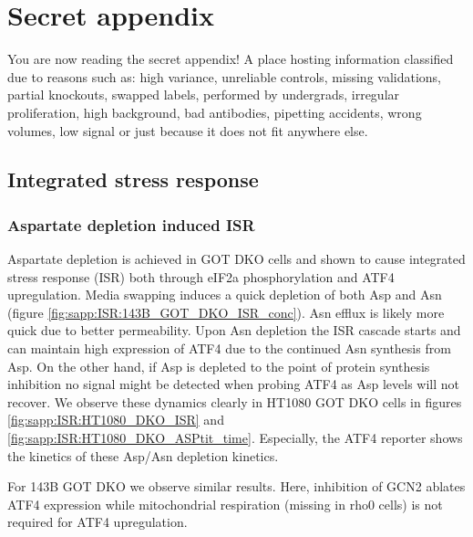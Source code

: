 \chapter{Secret appendix}
You are now reading the secret appendix!
A place hosting information classified due to reasons such as: high variance, unreliable controls, missing validations, partial knockouts, swapped labels, performed by undergrads, irregular proliferation, high background, bad antibodies, pipetting accidents, wrong volumes, low signal or just because it does not fit anywhere else.



\section{Integrated stress response}

\subsection{Aspartate depletion induced ISR}
Aspartate depletion is achieved in GOT DKO cells and shown to cause integrated stress response (ISR) both through eIF2a phosphorylation and ATF4 upregulation.
Media swapping induces a quick depletion of both Asp and Asn (figure \ref{fig:sapp:ISR:143B_GOT_DKO_ISR_conc}).
Asn efflux is likely more quick due to better permeability.
Upon Asn depletion the ISR cascade starts and can maintain high expression of ATF4 due to the continued Asn synthesis from Asp.
On the other hand, if Asp is depleted to the point of protein synthesis inhibition no signal might be detected when probing ATF4 as Asp levels will not recover.
We observe these dynamics clearly in HT1080 GOT DKO cells in figures \ref{fig:sapp:ISR:HT1080_DKO_ISR} and \ref{fig:sapp:ISR:HT1080_DKO_ASPtit_time}.
Especially, the ATF4 reporter shows the kinetics of these Asp/Asn depletion kinetics.

For 143B GOT DKO we observe similar results.
Here, inhibition of GCN2 ablates ATF4 expression while mitochondrial respiration (missing in rho0 cells) is not required for ATF4 upregulation.

